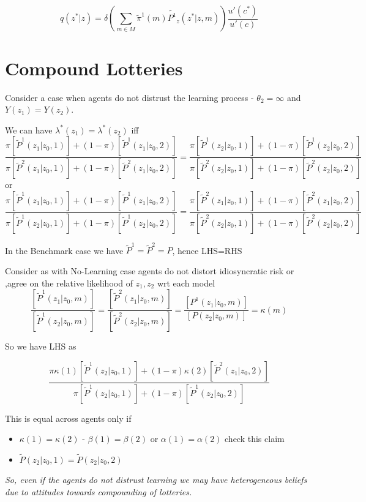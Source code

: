 \documentclass[12pt]{article}
\begin{document}
\[q(z^* |z )=\delta \left(\sum_{m \in M}\tilde{\pi}^1(m)\tilde{P^1}_z(z^* |z,m)\right)\frac{ u'(c^*)}{u'(c)}\]

\section{Compound Lotteries}
Consider a case when agents do not distrust the learning process - $\theta_2=\infty$ and  $Y(z_1)=Y(z_2)$.

We can have $\lambda^*(z_1)=\lambda^*(z_2)$ iff
\scriptsize{
\[\frac{\pi[\tilde{P}^1(z_1 |z_0,1)]+(1-\pi)[\tilde{P}^1(z_1 | z_0,2)]}{\pi[\tilde{P}^2(z_1 |z_0,1)]+(1-\pi)[\tilde{P}^2(z_1 | z_0,2)]} = \frac{\pi[\tilde{P}^1(z_2 |z_0,1)]+(1-\pi)[\tilde{P}^1(z_2 | z_0,2)]}{\pi[\tilde{P}^2(z_2 |z_0,1)]+(1-\pi)[\tilde{P}^2(z_2 | z_0,2)]}\]
	}
	or
\scriptsize{
\[\frac{\pi[\tilde{P}^1(z_1 |z_0,1)]+(1-\pi)[\tilde{P}^1(z_1 | z_0,2)]}{\pi[\tilde{P}^1(z_2 |z_0,1)]+(1-\pi)[\tilde{P}^1(z_2 | z_0,2)]} = \frac{\pi[\tilde{P}^2(z_1 |z_0,1)]+(1-\pi)[\tilde{P}^2(z_1 | z_0,2)]}{\pi[\tilde{P}^2(z_2 |z_0,1)]+(1-\pi)[\tilde{P}^2(z_2 | z_0,2)]}\]
	}	 

In the Benchmark case we have $\tilde{P}^1=\tilde{P}^2=P$, hence LHS=RHS
  
Consider as with No-Learning case agents do not distort idiosyncratic risk or ,agree on the relative likelihood of $z_1,z_2$ wrt each model
\[\frac{[\tilde{P}^1(z_1|z_0,m)]}{[\tilde{P}^1(z_2|z_0,m)]}= \frac{[\tilde{P}^2(z_1|z_0,m)]}{[\tilde{P}^2(z_2|z_0,m)]}=\frac{[P^1(z_1|z_0,m)]}{[P(z_2|z_0,m)]}=\kappa(m)\]

So we have LHS as

\scriptsize{
\[\frac{\pi\kappa(1)[\tilde{P}^1(z_2 |z_0,1)]+(1-\pi)\kappa(2)[\tilde{P}^2(z_1 | z_0,2)]}{\pi[\tilde{P}^1(z_2 |z_0,1)]+(1-\pi)[\tilde{P}^1(z_2 | z_0,2)]}\]
}

This is equal across agents only if 
\begin{itemize}
	\item $\kappa(1)=\kappa(2)$ - $\beta(1)=\beta(2)$ or $\alpha(1)=\alpha(2)$ check this claim
	\item $\tilde{P}(z_2 | z_0,1)=\tilde{P}(z_2 | z_0,2)$
\end{itemize}

\emph{So, even if the agents do not distrust learning we may have heterogeneous beliefs due to attitudes towards compounding of lotteries.}
\end{document}
